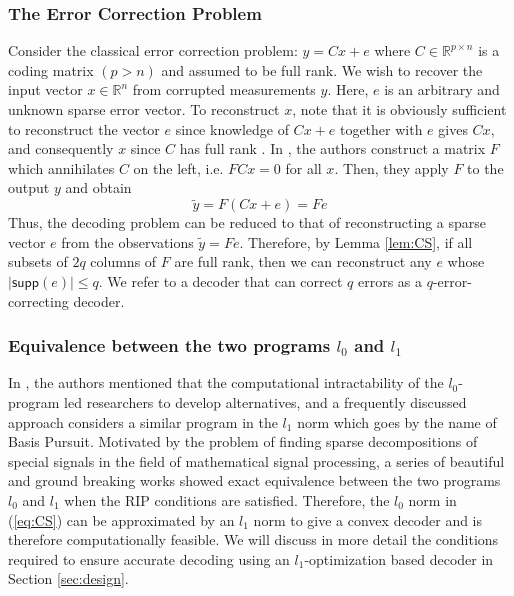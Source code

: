 \documentclass[journal]{IEEEtran}
\begin{document}
\subsubsection{The Error Correction Problem  \cite{Candes_Tao}} \label{sec:error_correction}
Consider the classical error correction problem: $y=Cx + e$ where $C\in \mathbb{R}^{p\times n}$ is a coding matrix $(p > n)$ and assumed to be full rank. We wish to recover the input vector $x \in \mathbb{R}^n$ from corrupted measurements $y$. Here, $e$ is an arbitrary and unknown sparse error vector. To reconstruct $x$, note that it is obviously sufficient to reconstruct the vector $e$ since knowledge of $Cx + e$ together with $e$ gives $Cx$, and consequently $x$ since $C$ has full rank \cite{Candes_Tao}. In \cite{Candes_Tao}, the authors construct a matrix $F$ which annihilates $C$ on the left, i.e.  $FCx = 0$ for all $x$. Then, they apply $F$ to the output $y$ and obtain
\begin{equation}
	\tilde y = F (Cx + e) = Fe 
\end{equation}
Thus, the decoding problem can be reduced to that of reconstructing a sparse vector $e$ from the observations $\tilde y = Fe$. Therefore, by Lemma \ref{lem:CS}, if all subsets of $2q$ columns of $F$ are full rank, then we can reconstruct any $e$ whose  $\lvert \textsf{supp}(e) \rvert \le q$. We refer to a decoder that can correct $q$ errors as a $q$-error-correcting decoder.

\subsubsection{ Equivalence between the two programs $l_0$ and $l_1$}\label{sec:equiv}
In \cite{Candes_Tao}, the authors mentioned that the computational intractability of the $l_0$-program led researchers to develop alternatives, and a frequently discussed approach considers a similar program in the $l_1$ norm which goes by the name of Basis Pursuit. Motivated by the problem of finding sparse decompositions of special signals in the field of mathematical signal processing, a series of beautiful and ground breaking works \cite{Donoho2003, Elad2002, Gribonval2003, Tropp2004} showed exact equivalence between the two programs $l_0$ and $l_1$ when the RIP conditions are satisfied. Therefore, the $l_0$ norm in (\ref{eq:CS}) can be approximated by an $l_1$ norm to give a convex decoder and is therefore computationally feasible. 
We will discuss in more detail the conditions required to ensure accurate decoding using an $l_1$-optimization based decoder in Section \ref{sec:design}. 
\end{document}
